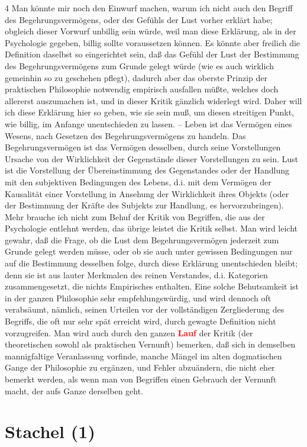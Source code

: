 \documentclass[a4paper,12pt,twoside]{book}
\newcommand{\match}[1]{\textcolor{red}{\textbf{#1}}}
\newcommand{\unnumberedsection}[1]{
	\section*{#1}
	\addcontentsline{toc}{section}{#1}
	\markright{#1}
}
\begin{document}
	4 Man könnte mir noch den Einwurf machen, warum ich nicht auch den Begriff des Begehrungsvermögens, oder des Gefühls der Lust vorher erklärt habe; obgleich dieser Vorwurf unbillig sein würde, weil man diese Erklärung, als in der Psychologie gegeben, billig sollte voraussetzen können. Es könnte aber freilich die Definition daselbst so eingerichtet sein, daß das Gefühl der Lust der Bestimmung des Begehrungsvermögens zum Grunde gelegt würde (wie es auch wirklich gemeinhin so zu geschehen pflegt), dadurch aber das oberste Prinzip der praktischen Philosophie notwendig empirisch ausfallen müßte, welches doch allererst auszumachen ist, und in dieser Kritik gänzlich widerlegt wird. Daher will ich diese Erklärung hier so geben, wie sie sein muß, um diesen streitigen Punkt, wie billig, im Anfange unentschieden zu lassen. – Leben ist das Vermögen eines Wesens, nach Gesetzen des Begehrungsvermögens zu handeln. Das Begehrungsvermögen ist das Vermögen desselben, durch seine Vorstellungen Ursache von der Wirklichkeit der Gegenstände dieser Vorstellungen zu sein. Lust ist die Vorstellung der Übereinstimmung des Gegenstandes oder der Handlung mit den subjektiven Bedingungen des Lebens, d.i. mit dem Vermögen der Kausalität einer Vorstellung in Ansehung der Wirklichkeit ihres Objekts (oder der Bestimmung der Kräfte des Subjekts zur Handlung, es hervorzubringen). Mehr brauche ich nicht zum Behuf der Kritik von Begriffen, die aus der Psychologie entlehnt werden, das übrige leistet die Kritik selbst. Man wird leicht gewahr, daß die Frage, ob die Lust dem Begehrungsvermögen jederzeit zum Grunde gelegt werden müsse, oder ob sie auch unter gewissen Bedingungen nur auf die Bestimmung desselben folge, durch diese Erklärung unentschieden bleibt; denn sie ist aus lauter Merkmalen des reinen Verstandes, d.i. Kategorien zusammengesetzt, die nichts Empirisches enthalten. Eine solche Behutsamkeit ist in der ganzen Philosophie sehr empfehlungswürdig, und wird dennoch oft verabsäumt, nämlich, seinen Urteilen vor der vollständigen Zergliederung des Begriffs, die oft nur sehr spät erreicht wird, durch gewagte Definition nicht vorzugreifen. Man wird auch durch den ganzen \match{Lauf} der Kritik (der theoretischen sowohl als praktischen Vernunft) bemerken, daß sich in demselben mannigfaltige Veranlassung vorfinde, manche Mängel im alten dogmatischen Gange der Philosophie zu ergänzen, und Fehler abzuändern, die nicht eher bemerkt werden, als wenn man von Begriffen einen Gebrauch der Vernunft macht, der aufs Ganze derselben geht. 
	
	\unnumberedsection{Stachel (1)} 
\end{document}
